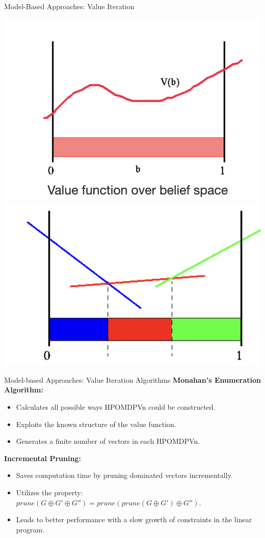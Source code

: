 \documentclass[presentation, smaller]{beamer}
\begin{document}
\begin{frame}{Model-Based Approaches: Value Iteration}
    \begin{itemize}
     \includegraphics[scale = 0.3]{pic_1.png}
    \includegraphics[scale = 0.32]{pic_3.png}
    \end{itemize}
    
\end{frame}

\begin{frame}{Model-based Approaches: Value Iteration Algorithms}
  \textbf{Monahan’s Enumeration Algorithm:}
  \begin{itemize}
    \item Calculates all possible ways HPOMDPVn could be constructed.
    \item Exploits the known structure of the value function.
    \item Generates a finite number of vectors in each HPOMDPVn.
  \end{itemize}

  \textbf{Incremental Pruning:}
  \begin{itemize}
    \item Saves computation time by pruning dominated vectors incrementally.
    \item Utilizes the property: $prune(G⊕G'⊕G'') = prune(prune(G⊕G')⊕G'')$.
    \item Leads to better performance with a slow growth of constraints in the linear program.
  \end{itemize}
\end{frame}
\end{document}
